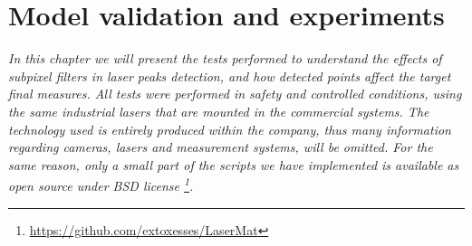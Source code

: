 \chapter{Model validation and experiments}
\label{ch:experimets}


\textit{In this chapter we will present the tests performed to understand the effects of subpixel filters in laser peaks detection, and how detected points affect the target final measures. All tests were performed in safety and controlled conditions, using the same industrial lasers that are mounted in the commercial systems. The technology used is entirely produced within the company, thus many information regarding cameras, lasers and measurement systems, will be omitted. For the same reason, only a small part of the scripts we have implemented is available as open source under BSD license \footnote{\url{https://github.com/extoxesses/LaserMat}}.}

  
  
  
  
    

